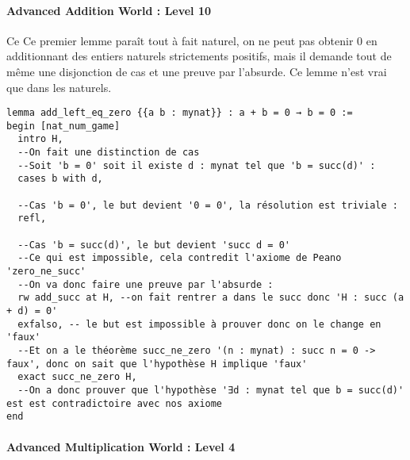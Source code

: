 \paragraph{Advanced Addition World : Level 10}

Ce
Ce premier lemme paraît tout à fait naturel, on ne peut pas obtenir 0 en additionnant des entiers naturels strictements positifs, mais il demande tout de même une disjonction de cas et une preuve par l'absurde. 
Ce lemme n'est vrai que dans les naturels.

\begin{verbatim}
lemma add_left_eq_zero {{a b : mynat}} : a + b = 0 → b = 0 :=
begin [nat_num_game]
  intro H,
  --On fait une distinction de cas
  --Soit 'b = 0' soit il existe d : mynat tel que 'b = succ(d)' :
  cases b with d,

  --Cas 'b = 0', le but devient '0 = 0', la résolution est triviale :
  refl,

  --Cas 'b = succ(d)', le but devient 'succ d = 0'
  --Ce qui est impossible, cela contredit l'axiome de Peano 'zero_ne_succ'
  --On va donc faire une preuve par l'absurde :
  rw add_succ at H, --on fait rentrer a dans le succ donc 'H : succ (a + d) = 0'
  exfalso, -- le but est impossible à prouver donc on le change en 'faux'
  --Et on a le théorème succ_ne_zero '(n : mynat) : succ n = 0 -> faux', donc on sait que l'hypothèse H implique 'faux'
  exact succ_ne_zero H,
  --On a donc prouver que l'hypothèse '∃d : mynat tel que b = succ(d)' est est contradictoire avec nos axiome
end
\end{verbatim}

\paragraph{Advanced Multiplication World : Level 4}

